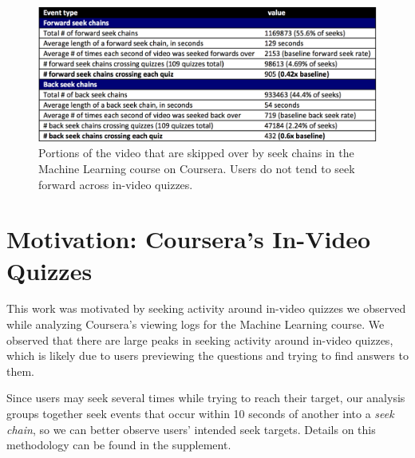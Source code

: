 \documentclass{sigchi}
\begin{document}
\begin{figure}
\includegraphics[width=1.0\columnwidth]{table-of-seeks-short}
\caption{Portions of the video that are skipped over by seek chains in the Machine Learning course on Coursera. Users do not tend to seek forward across in-video quizzes.}
\label{fig:table-of-seeks-short}
\end{figure}

\section{Motivation: Coursera's In-Video Quizzes}


This work was motivated by seeking activity around in-video quizzes we observed while analyzing Coursera's viewing logs for the Machine Learning course. We observed that there are large peaks in seeking activity around in-video quizzes, which is likely due to users previewing the questions and trying to find answers to them. %


Since users may seek several times while trying to reach their target, our analysis groups together seek events that occur within 10 seconds of another into a \textit{seek chain}, so we can better observe users' intended seek targets. Details on this methodology can be found in the supplement.
\end{document}
